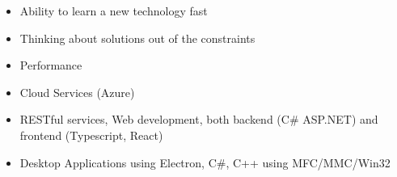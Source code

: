 \documentclass[9pt]{developercv} %
\begin{document}
\begin{minipage}[t]{0.4\textwidth} %
	\vspace{-\baselineskip} %
    
	\begin{itemize}
      \item Ability to learn a new technology fast
      \item Thinking about solutions out of the constraints
      \item Performance
    \end{itemize}
    
    \begin{itemize}
        \item Cloud Services (Azure)
        \item RESTful services, Web development, both backend (C# ASP.NET) and frontend (Typescript, React)
        \item Desktop Applications using Electron, C\#, C++ using MFC/MMC/Win32
    \end{itemize}
\end{minipage}
\hfill %
\begin{minipage}[t]{0.5\textwidth} %
	\vspace{-\baselineskip} %
    
	\begin{barchart}{5.5}
	\end{barchart}
\end{minipage}


\vspace{0.5cm}



\end{document}
